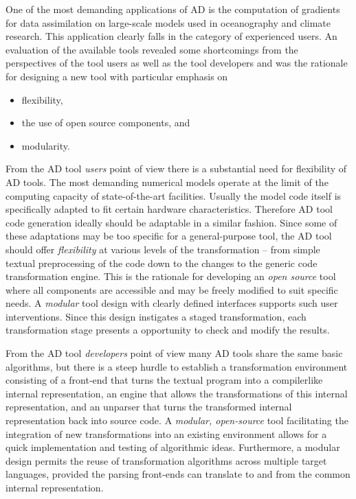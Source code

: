 \documentclass{book}
\begin{document}
One of the most demanding applications of AD is the computation of gradients for 
data assimilation on large-scale models used in oceanography and climate research. 
This application clearly falls in the category of experienced users.
An evaluation of the available tools revealed some shortcomings from the perspectives 
of the tool users as well as the tool developers and was the rationale for 
designing a new tool with particular emphasis on   
\begin{itemize}
\item flexibility,
\item the use of open source components, and 
\item modularity.
\end{itemize} 
From  the AD tool  {\em users} point of view there is a substantial need for   
flexibility of AD tools. 
The most demanding  numerical models 
operate at the limit of the computing capacity of state-of-the-art facilities. 
Usually the model code itself is specifically adapted to fit certain 
hardware characteristics. 
Therefore AD tool code generation ideally should be adaptable in a similar fashion. 
Since some of these adaptations may be  too specific for a general-purpose tool,
the AD tool should offer {\em flexibility} at various levels of the 
transformation -- from simple textual preprocessing of the code down to the 
changes to the generic code transformation engine.
This is the rationale for developing an {\em open source} tool where  all
components are accessible  and may be freely modified to suit specific 
needs.  
A {\em modular} tool design with clearly defined interfaces supports such 
user interventions. 
Since this design instigates a staged 
transformation,
each transformation stage presents a opportunity to check and modify the 
results. 

From the AD tool {\em developers} point of view
many AD tools share the same basic algorithms, but
there is a  steep hurdle to establish a transformation environment consisting of
a front-end that turns the textual program into a 
compilerlike internal representation, an engine that allows the 
transformations  of this internal representation, and an unparser that 
turns the transformed internal representation back into source code. 
A {\em modular, open-source} tool facilitating 
the integration of new transformations into an existing environment 
allows for a quick implementation and testing of algorithmic ideas.
Furthermore, a modular design permits the reuse of transformation algorithms 
across multiple target languages, provided the parsing front-ends can translate to and from the 
common internal representation.
\end{document}
